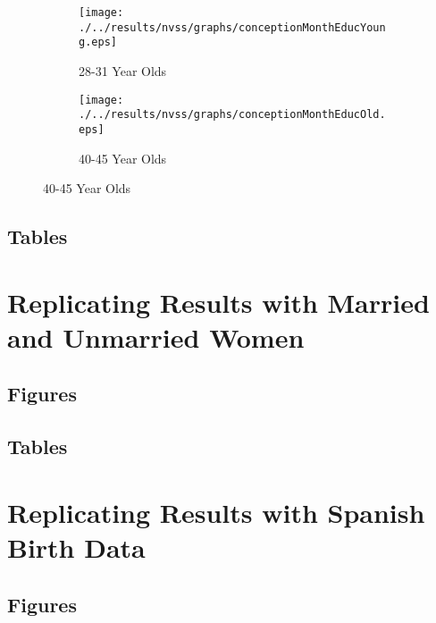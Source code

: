 \documentclass[a4paper, 12 pt]{article}
\theoremstyle{plain}
\begin{document}
\begin{spacing}{1.4}
\begin{figure}[htpb!]
  \begin{center}
    \caption{Birth Prevalence by Month, Age Group, and Education}
    \label{bqFig:concepEduc}
    \begin{subfigure}{.5\textwidth}
      \centering
      \texttt{[image: ./../results/nvss/graphs/conceptionMonthEducYoung.eps]}
      \caption{28-31 Year Olds}
      \label{fig:educYoung}
    \end{subfigure}%
    \begin{subfigure}{.5\textwidth}
      \centering
      \texttt{[image: ./../results/nvss/graphs/conceptionMonthEducOld.eps]}
      \caption{40-45 Year Olds}
      \label{fig:educOld}
    \end{subfigure}
  \end{center}
\end{figure}
\clearpage

\subsection{Tables}

\clearpage


\section{Replicating Results with Married and Unmarried Women}
\subsection{Figures}

\newpage

\subsection{Tables}

\newpage


\clearpage
\section{Replicating Results with Spanish Birth Data}
\subsection{Figures}

\clearpage

\end{spacing}
\end{document}
